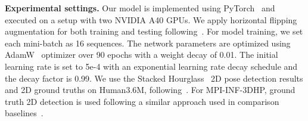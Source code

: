 \documentclass[10pt,twocolumn,letterpaper]{article}
\begin{document}
    \textbf{Experimental settings.} Our model is implemented using PyTorch~\cite{pytorch} and executed on a setup with two NVIDIA A40 GPUs. We apply horizontal flipping augmentation for both training and testing following~\cite{motionbert, poseformerv2}. For model training, we set each mini-batch as 16 sequences. The network parameters are optimized using AdamW~\cite{AdamW} optimizer over 90 epochs with a weight decay of 0.01. The initial learning rate is set to 5e-4 with an exponential learning rate decay schedule and the decay factor is 0.99. We use the Stacked Hourglass~\cite{newell2016stacked} 2D pose detection results and 2D ground truths on Human3.6M, following~\cite{motionbert}. For MPI-INF-3DHP, ground truth 2D detection is used following a similar approach used in comparison baselines~\cite{poseformerv2, STCFormer}.
    
\end{document}
